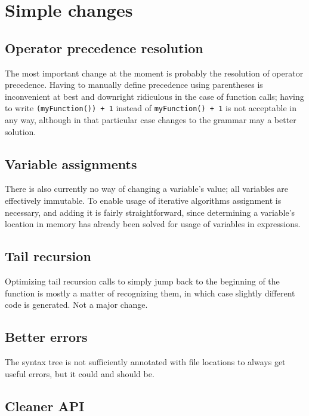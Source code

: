     \section{Simple changes}
    
    	\subsection{Operator precedence resolution}
    	
    	The most important change at the moment is probably the resolution of operator precedence. Having to manually define precedence using parentheses is inconvenient at best and downright ridiculous in the case of function calls; having to write \lstinline$(myFunction()) + 1$ instead of \lstinline$myFunction() + 1$ is not acceptable in any way, although in that particular case changes to the grammar may a better solution.
		
		\subsection{Variable assignments}
		
		There is also currently no way of changing a variable's value; all variables are effectively immutable. To enable usage of iterative algorithms assignment is necessary, and adding it is fairly straightforward, since determining a variable's location in memory has already been solved for usage of variables in expressions.
		
		\subsection{Tail recursion}
		
		Optimizing tail recursion calls to simply jump back to the beginning of the function is mostly a matter of recognizing them, in which case slightly different code is generated. Not a major change.
		
		\subsection{Better errors}
		
		The syntax tree is not sufficiently annotated with file locations to always get useful errors, but it could and should be.
		
		\subsection{Cleaner API}
		
